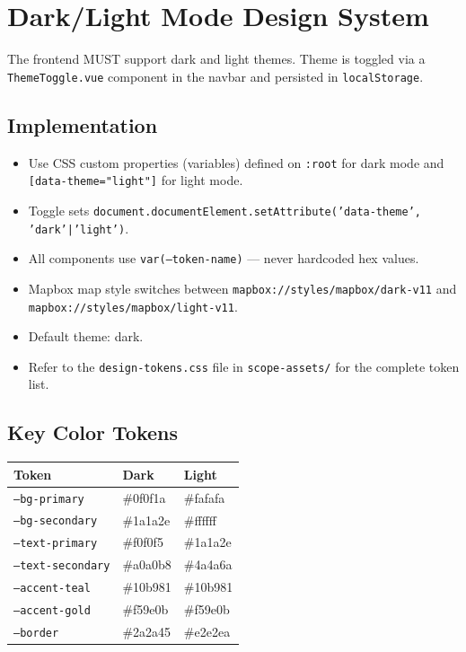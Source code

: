\documentclass[12pt,letterpaper]{article}
\begin{document}
\newpage

\section{Dark/Light Mode Design System}

The frontend MUST support dark and light themes. Theme is toggled via a \texttt{ThemeToggle.vue} component in the navbar and persisted in \texttt{localStorage}.

\subsection{Implementation}
\begin{itemize}
  \item Use CSS custom properties (variables) defined on \texttt{:root} for dark mode and \texttt{[data-theme="light"]} for light mode.
  \item Toggle sets \texttt{document.documentElement.setAttribute('data-theme', 'dark'|'light')}.
  \item All components use \texttt{var(--token-name)} --- never hardcoded hex values.
  \item Mapbox map style switches between \texttt{mapbox://styles/mapbox/dark-v11} and \texttt{mapbox://styles/mapbox/light-v11}.
  \item Default theme: dark.
  \item Refer to the \texttt{design-tokens.css} file in \texttt{scope-assets/} for the complete token list.
\end{itemize}

\subsection{Key Color Tokens}
\begin{tabular}{|l|l|l|}
\hline
\textbf{Token} & \textbf{Dark} & \textbf{Light} \\
\hline
\texttt{--bg-primary} & \#0f0f1a & \#fafafa \\
\texttt{--bg-secondary} & \#1a1a2e & \#ffffff \\
\texttt{--text-primary} & \#f0f0f5 & \#1a1a2e \\
\texttt{--text-secondary} & \#a0a0b8 & \#4a4a6a \\
\texttt{--accent-teal} & \#10b981 & \#10b981 \\
\texttt{--accent-gold} & \#f59e0b & \#f59e0b \\
\texttt{--border} & \#2a2a45 & \#e2e2ea \\
\hline
\end{tabular}
\end{document}
